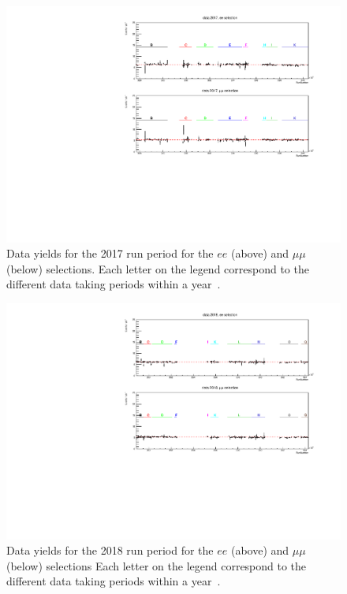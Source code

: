 \begin{figure}[ht]
\centering
\includegraphics[width=\textwidth]{figures/analysis/datamc/Yields/compare_data_yields2017.pdf}
\caption[Data yields for the 2017 run period for the $ee$ (above) and $\mu\mu$ (below) selections.]{Data yields for the 2017 run period for the $ee$ (above) and $\mu\mu$ (below) selections. Each letter on the legend correspond to the different data taking periods within a year~\cite{Aad:2019fac}.}
\label{fig:yields2017}
\end{figure}

\begin{figure}[ht]
\centering
\includegraphics[width=\textwidth]{figures/analysis/datamc/Yields/compare_data_yields2018.pdf}
\caption[Data yields for the 2018 run period for the $ee$ (above) and $\mu\mu$ (below) selections.]{Data yields for the 2018 run period for the $ee$ (above) and $\mu\mu$ (below) selections Each letter on the legend correspond to the different data taking periods within a year~\cite{Aad:2019fac}.}
\label{fig:yields2018}
\end{figure}

